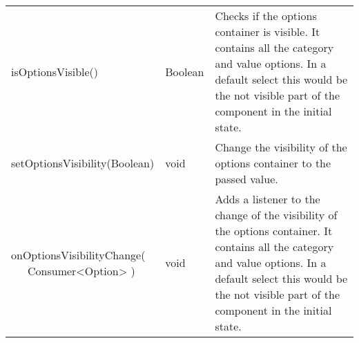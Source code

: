 \begin{table}[!htb]
\begin{tabular}{ p{5cm} p{3cm} p{4.5cm} }
        isOptionsVisible()                   & Boolean                & Checks if the options container is visible. 
                                                                        It contains all the category and value options. 
                                                                        In a default select this would be the not visible part of the component in the initial state. \\
        setOptionsVisibility(Boolean)        & void                   & Change the visibility of the options container to the passed value. \\
        \tbbr{
            onOptionsVisibilityChange( \\
                \ \ \ Consumer<Option>
            )}                               & void                   & Adds a listener to the change of the visibility of the options container. 
                                                                        It contains all the category and value options. 
                                                                        In a default select this would be the not visible part of the component in the initial state. \\
        \bottomrule[0.5pt]
    \end{tabular}
\end{table}

